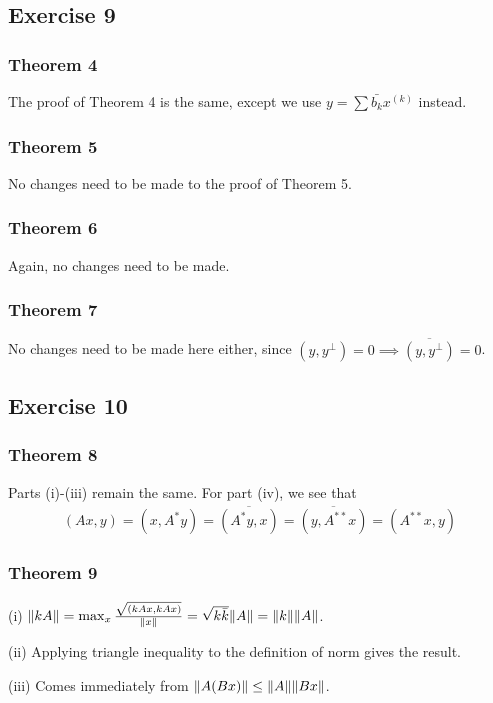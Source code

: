 \subsection{Exercise 9}
\subsubsection{Theorem 4}
The proof of Theorem 4 is the same, except we use $y = \sum \bar{b_k} x^{(k)}$ instead.

\subsubsection{Theorem 5}
No changes need to be made to the proof of Theorem 5.

\subsubsection{Theorem 6}
Again, no changes need to be made.

\subsubsection{Theorem 7}
No changes need to be made here either, since $(y, y^{\perp}) = 0 \implies \overline{(y, y^{\perp})} = 0$.

\subsection{Exercise 10}
\subsubsection{Theorem 8}
Parts (i)-(iii) remain the same. For part (iv), we see that 
\begin{align*}
        (Ax, y) = (x, A^{*}y) = \overline{(A^{*}y, x)} = \overline{(y, A^{**}x)} = (A^{**}x, y)
\end{align*}

\subsubsection{Theorem 9}
(i) $\norm{kA} = \max_x \frac{\sqrt{(kAx, kAx)}}{\norm{x}} = \sqrt{k\bar{k}} \norm{A} = \norm{k} \norm{A}$.

(ii) Applying triangle inequality to the definition of norm gives the result.

(iii) Comes immediately from $\norm{A(Bx)} \leq \norm{A} \norm{Bx}$.
